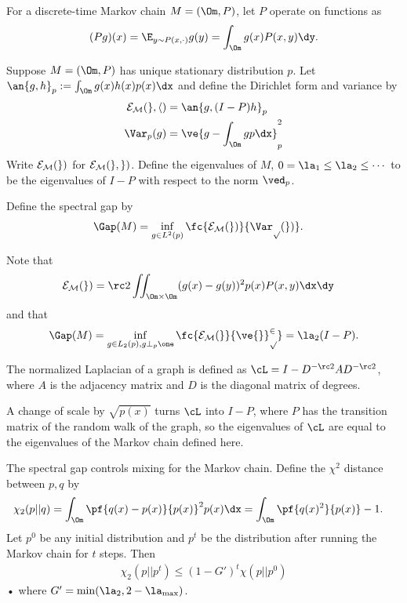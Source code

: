 \begin{df}
For a discrete-time Markov chain $M=(\Om, P)$, let $P$ operate on functions as
\begin{align}
(Pg)(x) = \E_{y\sim P(x,\cdot)} g(y) = \int_{\Om} g(x)P(x,y)\dy.
\end{align}

Suppose $M=(\Om, P)$ has unique stationary distribution $p$.
Let
$\an{g,h}_p :=\int_{\Om} g(x)h(x)p(x)\dx$ and define the Dirichlet form and variance by
\begin{align}
\cal E_M(g,h) &= \an{g, (I-P)h}_p \\
\Var_p(g) &= \ve{g-\int_{\Om} gp\dx}_p^2
\end{align}
Write $\cal E_M(g)$ for $\cal E_M(g,g)$. 
Define the eigenvalues of $M$, $0=\la_1\le \la_2\le \cdots$ to be the eigenvalues of $I-P$ with respect to the norm $\ved_{p}$. 

Define the spectral gap by
\begin{align}
\Gap(M) &= \inf_{g\in L^2(p)} \fc{\cal E_M(g)}{\Var_p(g)}.
\end{align}
\end{df}
Note that 
\begin{align}
\cal E_M(g) &= \rc 2 \iint_{\Om\times \Om}(g(x)-g(y))^2 p(x)P(x,y)\dx\dy
\end{align}
and that 
\begin{align}
\Gap(M) = \inf_{g\in L_2(p), g\perp_p \one} \fc{\cal E_M(g}{\ve{g}_p^2} = \la_2(I-P).
\end{align}

\begin{rem}
The normalized Laplacian of a graph is defined as $\cL = I-D^{-\rc 2} A D^{-\rc 2}$, where $A$ is the adjacency matrix and $D$ is the diagonal matrix of degrees. 

A change of scale by $\sqrt{p(x)}$ turns $\cL$ into $I-P$, where $P$ has the transition matrix of the random walk of the graph, so the eigenvalues of $\cL$ are equal to the eigenvalues of the Markov chain defined here.
\end{rem}

The spectral gap controls mixing for the Markov chain. Define the $\chi^2$ distance between $p,q$ by
\begin{align}
\chi_2(p||q) &= \int_\Om \pf{q(x)-p(x)}{p(x)}^2p(x)\dx
= \int_\Om \pf{q(x)^2}{p(x)} - 1.
\end{align}
Let $p^0$ be any initial distribution and $p^t$ be the distribution after running the Markov chain for $t$ steps. Then
\begin{align}\label{eq:gap-mix}
\chi_2(p||p^t) \le (1-G')^t \chi(p||p^0)
\end{align}•
where $G'=\min(\la_2, 2-\la_{\max})$. 



